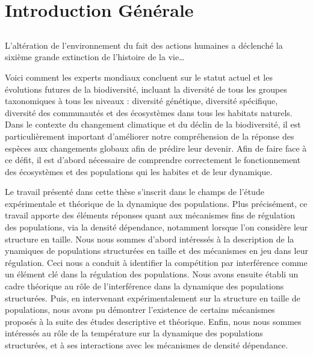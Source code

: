 \part{Introduction Générale}

\chapter*[Introduction]{}

\vspace{-5cm}

\og L'altération de l'environnement du fait des actions
humaines a déclenché la sixième grande extinction de l'histoire de la vie\ldots\fg
\autocites{stuart-chapin-iii2000a}

Voici comment les experts mondiaux concluent sur le statut actuel et les
évolutions futures de la biodiversité, incluant la diversité de tous les groupes
taxonomiques à tous les niveaux : diversité génétique, diversité spécifique,
diversité des communautés et des écosystèmes dans tous les habitats naturels.
Dans le contexte du changement climatique et du déclin de la biodiversité, il
est particulièrement important d'améliorer notre compréhension de la réponse
des espèces aux changements globaux afin de prédire leur devenir. Afin de faire
face à ce défit, il est d'abord nécessaire de comprendre correctement le
fonctionnement des écosystèmes et des populations qui les habites et de leur
dynamique. 

Le travail présenté dans cette thèse s'inscrit dans le champs de l'étude
expérimentale et théorique de la dynamique des populations. Plus précisément, ce
travail apporte des éléments réponses quant aux mécanismes fins de régulation
des populations, via la densité dépendance, notamment lorsque l'on considère
leur structure en taille.
Nous nous sommes d'abord intéressés à la description de la ynamiques
de populations structurées en taille et des mécanismes en jeu dans leur
régulation. Ceci nous a conduit à identifier la compétition par interférence
comme un élément clé dans la régulation des populations.
Nous avons ensuite établi un cadre théorique au rôle de l'interférence dans la
dynamique des populations structurées. Puis, en intervenant expérimentalement
sur la structure en taille de populations, nous avons pu démontrer 
l'existence de certains mécanismes proposés à la suite des études descriptive et
théorique.
Enfin, nous nous sommes intéressés au rôle de la température sur la dynamique
des populations structurées, et à ses interactions avec les mécanismes de densité
dépendance.








